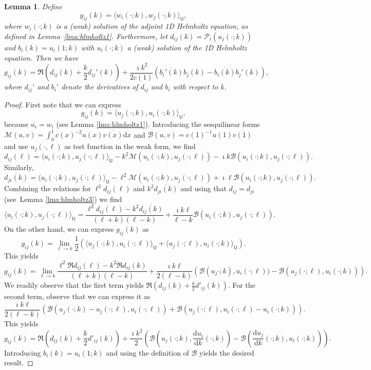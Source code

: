 \documentclass[12pt]{amsart}
\newtheorem{lma}{Lemma}
\begin{document}
\begin{lma}
\label{lma:hlmholtz2}
Define
\[
g_{ij}(k) = \langle w_i(\cdot; k),  w_j(\cdot; k)\rangle_{\mathsf{U}},
\]
where $w_i(\cdot; k)$ is a (weak) solution of the adjoint 1D Helmholtz equation, as defined in Lemma~\ref{lma:hlmholtz1}. 
Furthermore, let $d_{ij}(k) = \mathcal{P}_i(u_j(\cdot;k))$ and $b_i(k) = u_i(1;k)$ with $u_i(\cdot; k)$ a (weak) solution of the 1D Helmholtz equation. Then we have
\begin{equation}
g_{ij}(k) = \Re\left(d_{ij}(k) + {\textstyle\frac{k}{2}}d_{ij}'(k)\right) + {\textstyle\frac{\imath k^2}{2c(1)}}\left(\overline{b_i'(k)}b_j(k) - \overline{b_i(k)}b_j'(k)\right),
\end{equation}
where $d_{ij}'$ and $b_i'$ denote the derivatives of $d_{ij}$ and $b_i$ with respect to $k$. 
\end{lma}
\begin{proof}
First note that we can express
\[
g_{ij}(k) = \langle u_j(\cdot; k),  u_i(\cdot; k)\rangle_{\mathsf{U}},
\]
because $\overline{u_i} = w_i$ (see Lemma \ref{lma:hlmholtz1}). Introducing the sesquilinear forms $\mathcal{M}(u,v) = \int_0^1 c(x)^{-2}u(x)\overline{v(x)}\mathrm{d}x$ and $\mathcal{B}(u,v) = c(1)^{-1}u(1)\overline{v(1)}$ and use $u_j(\cdot,\ell)$ as test function in the weak form, we find
\[
d_{ij}(\ell) = \langle u_i(\cdot;k),  u_j(\cdot;\ell)\rangle_{\mathsf{U}} - k^2 \mathcal{M}(u_i(\cdot;k),  u_j(\cdot;\ell)) - \imath k \mathcal{B}( u_i(\cdot;k),  u_j(\cdot;\ell) ).
\]
Similarly,
\[
\overline{d_{ji}(k)} = \langle u_i(\cdot;k),  u_j(\cdot;\ell)\rangle_{\mathsf{U}} - \ell^2 \mathcal{M}(u_i(\cdot;k),  u_j(\cdot;\ell)) + \imath \ell \mathcal{B}( u_i(\cdot;k),  u_j(\cdot;\ell) ).
\]
Combining the relations for $\ell^2 d_{ij}(\ell)$ and $k^2 \overline{d_{ji}(k)}$ and using that $d_{ij} = d_{ji}$ (see~Lemma \ref{lma:hlmholtz3}) we find
\[
\langle u_i(\cdot;k), u_j(\cdot;\ell)\rangle_\mathsf{U} = \frac{\ell^2 d_{ij}(\ell) - k^2 \overline{d_{ij}(k)}}{(\ell+k)(\ell-k)} + \frac{\imath k\ell}{\ell-k} \mathcal{B}(u_i(\cdot;k),u_j(\cdot;\ell)).
\]
On the other hand, we can express $g_{ij}(k)$ as
\[
g_{ij}(k) = \lim_{\ell\rightarrow k} {\textstyle\frac{1}{2}}\left(\langle u_j(\cdot;k), u_i(\cdot;\ell)\rangle_\mathsf{U} + \langle u_j(\cdot;\ell), u_i(\cdot;k)\rangle_\mathsf{U}\right).
\]
This yields
\[
g_{ij}(k) = \lim_{\ell\rightarrow k} \frac{\ell^2 \Re d_{ij}(\ell) - k^2 \Re{d_{ij}(k)}}{(\ell+k)(\ell-k)} + \frac{\imath k\ell}{2(\ell - k)}\left(\mathcal{B}(u_j\cdot;k),u_i(\cdot;\ell)) - \mathcal{B}(u_j(\cdot;\ell),u_i(\cdot;k))\right).
\]
We readily observe that the first term yields $\Re (d_{ij}(k) + \frac{k}{2}d'_{ij}(k))$. For the second term, observe that we can express it as
\[
\frac{\imath k\ell}{2(\ell - k)} \left(\mathcal{B}(u_j(\cdot;k) - u_j(\cdot;\ell),u_i(\cdot;\ell)) + \mathcal{B}(u_j(\cdot;\ell),u_i(\cdot;\ell)-u_i(\cdot;k))\right).
\]
This yields
\[
g_{ij}(k) = \Re \left(d_{ij}(k) + \frac{k}{2}d'_{ij}(k)\right) + \frac{\imath k^2}{2}\left(\mathcal{B}\left(u_j(\cdot;k),\frac{\mathrm{d} u_i}{\mathrm{d}k}(\cdot;k)\right)-\mathcal{B}\left(\frac{\mathrm{d} u_j}{\mathrm{d}k}(\cdot;k),u_i(\cdot;k)\right)\right).
\]
Introducing $b_i(k) = u_i(1;k)$ and using the definition of $\mathcal{B}$ yields the desired result.
\end{proof}
\end{document}
